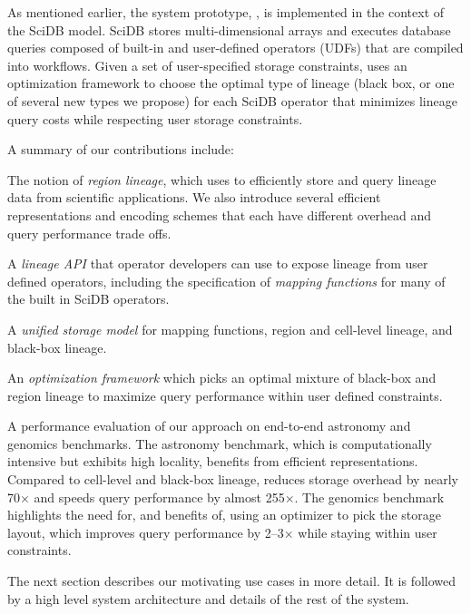 As mentioned earlier, the system prototype, \sys{}, is implemented in the
context of the SciDB model.  SciDB stores multi-dimensional arrays and executes
database queries composed of built-in and user-defined operators (UDFs) that
are compiled into workflows.  Given a set of user-specified storage
constraints, \sys{} uses an optimization framework to choose the optimal type
of lineage (black box, or one of several new types we propose) for each SciDB
operator that minimizes lineage query costs while respecting user storage
constraints.


A summary of our contributions include: 

\begin{CompactEnumerate}

\item The notion of {\it region lineage}, which \sys{} uses to efficiently
    store and query lineage data from scientific applications.  We also
    introduce several efficient representations and encoding schemes that each
    have different overhead and query performance trade offs.

\item A {\it lineage API} that operator developers can use to expose lineage
    from user defined operators, including the specification of {\it mapping
    functions} for many of the built in SciDB operators.

\item A {\it unified storage model} for mapping functions, region and
    cell-level lineage, and black-box lineage.

\item An {\it optimization framework} which picks an optimal mixture of
    black-box and region lineage  to maximize query
    performance within user defined constraints.

\item A performance evaluation of our approach on end-to-end astronomy and
    genomics benchmarks.  The astronomy benchmark, which is computationally
    intensive but exhibits high locality, benefits from efficient
    representations.  Compared to cell-level and black-box lineage, \sys{}
    reduces storage overhead by nearly 70$\times$ and speeds query performance
    by almost 255$\times$.  The genomics benchmark highlights the need for, and
    benefits of, using an optimizer to pick the storage layout, which improves
    query performance by 2--3$\times$ while staying within user constraints.
    

\end{CompactEnumerate}

The next section  describes our motivating use cases in more detail.  It is
followed by a high level system architecture and details of the rest of the
system.













